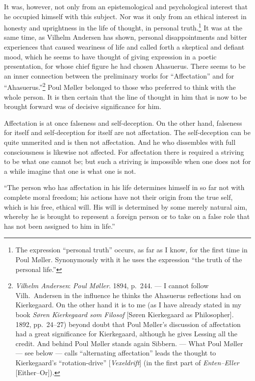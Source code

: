 \documentclass[12pt,a4paper]{book}
\newcommand{\opage}[1]{\marginnote{\footnotesize\textit{[#1]}}}
\begin{document}
It was, however, not only from an epistemological and psychological interest that he occupied
himself with this subject. Nor was it only from an ethical interest in honesty and
uprightness in the life of thought, in personal truth.\footnote{The expression ``personal
truth'' occurs, as far as I know, for the first time in Poul Møller. Synonymously with it he
uses the expression ``the truth of the personal life.''} It was at the same time, as Vilhelm
Andersen has shown, personal disappointments and bitter experiences that caused weariness of
life and called forth a skeptical and defiant mood, which he seems to have thought of giving
expression in a poetic presentation, for whose chief figure he had chosen Ahasuerus. There
seems to be an inner connection between the preliminary works for ``Affectation'' and for
``Ahasuerus.''\footnote{\emph{Vilhelm Andersen}: \emph{Poul Møller}. 1894, p.~244. --- I cannot
follow Vilh.\ Andersen in the influence he thinks the Ahasuerus reflections had on
Kierkegaard. On the other hand it is to me (as I have already stated in my book \emph{Søren
Kierkegaard som Filosof} [Søren Kierkegaard as Philosopher]. 1892, pp.~24--27) beyond doubt
that Poul Møller's discussion of affectation had a great significance for Kierkegaard,
although he gives Lessing all the credit. And behind Poul Møller stands again Sibbern. ---
What Poul Møller --- see below --- calls ``alternating affectation'' leads the thought to
Kierkegaard's ``rotation-drive'' [\emph{Vexeldrift}] (in the first part of \emph{Enten--Eller}
[Either--Or]).} Poul Møller belonged to those who preferred to think with the whole person.
It is then certain that the line of thought in him that is now to be brought forward was of
decisive significance for him.

\opage{124}Affectation is at once falseness and self-deception. On the other hand, falseness for itself
and self-deception for itself are not affectation. The self-deception can be quite unmerited
and is then not affectation. And he who dissembles with full consciousness is likewise not
affected. For affectation there is required a striving to be what one cannot be; but such a
striving is impossible when one does not for a while imagine that one is what one is not.

``The person who has affectation in his life determines himself in so far not with complete
moral freedom; his actions have not their origin from the true self, which is his free,
ethical will. His will is determined by some merely natural aim, whereby he is brought to
represent a foreign person or to take on a false role that has not been assigned to him in
life.''
\end{document}
